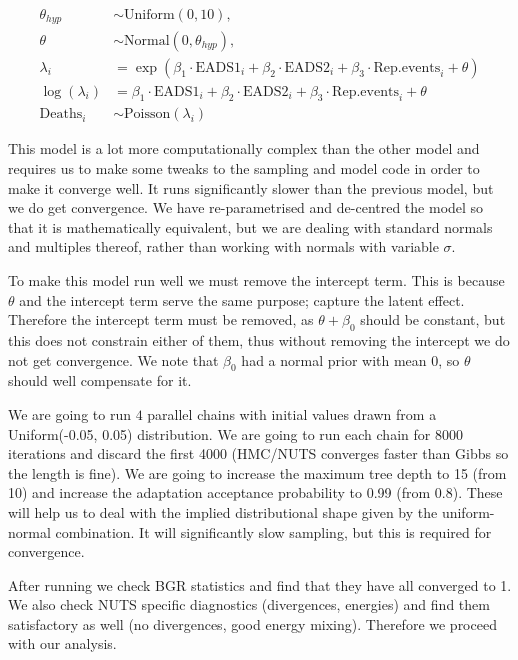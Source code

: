 \documentclass[12pt]{extarticle}
\begin{document}
\begin{align*}
\theta_{hyp} &\sim \mathrm{Uniform}(0, 10),\\
\theta &\sim \mathrm{Normal}(0, \theta_{hyp}),\\
\lambda_i &= \exp(\beta_1 \cdot \mathrm{EADS1}_i + \beta_2 \cdot \mathrm{EADS2}_i + \beta_3 \cdot \mathrm{Rep.events}_i + \theta)\\
\log(\lambda_i) &= \beta_1 \cdot \mathrm{EADS1}_i + \beta_2 \cdot \mathrm{EADS2}_i + \beta_3 \cdot \mathrm{Rep.events}_i + \theta\\
\mathrm{Deaths}_i &\sim \mathrm{Poisson}(\lambda_i)
\end{align*} 

This model is a lot more computationally complex than the other model and requires us to make some tweaks to the sampling and model code in order to make it converge well. It runs significantly slower than the previous model, but we do get convergence. We have re-parametrised and de-centred the model so that it is mathematically equivalent, but we are dealing with standard normals and multiples thereof, rather than working with normals with variable $\sigma$. 

To make this model run well we must remove the intercept term. This is because $\theta$ and the intercept term serve the same purpose; capture the latent effect. Therefore the intercept term must be removed, as $\theta + \beta_0$ should be constant, but this does not constrain either of them, thus without removing the intercept we do not get convergence. We note that $\beta_0$ had a normal prior with mean 0, so $\theta$ should well compensate for it.

We are going to run $4$ parallel chains with initial values drawn from a Uniform(-0.05, 0.05) distribution. We are going to run each chain for 8000 iterations and discard the first 4000 (HMC/NUTS converges faster than Gibbs so the length is fine). We are going to increase the maximum tree depth to 15 (from 10) and increase the adaptation acceptance probability to 0.99 (from 0.8). These will help us to deal with the implied distributional shape given by the uniform-normal combination. It will significantly slow sampling, but this is required for convergence.

After running we check BGR statistics and find that they have all converged to 1. We also check NUTS specific diagnostics (divergences, energies) and find them satisfactory as well (no divergences, good energy mixing). Therefore we proceed with our analysis.
\end{document}
